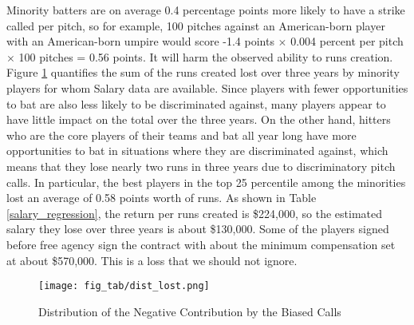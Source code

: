 \documentclass[dvipdfmx, 12pt]{jsarticle}
\begin{document}
\begin{table}[ht]
  \centering
  \caption{Runs Expectancy by 24 States}
  \label{re24}
\end{table}

Minority batters are on average 0.4 percentage points more likely to have a strike called per pitch, so for example, 100 pitches against an American-born player with an American-born umpire would score -1.4 points $\times$ 0.004 percent per pitch $\times$ 100 pitches = 0.56 points. It will harm the observed ability to runs creation.
Figure \ref{dist_lost} quantifies the sum of the runs created lost over three years by minority players for whom Salary data are available. Since players with fewer opportunities to bat are also less likely to be discriminated against, many players appear to have little impact on the total over the three years. On the other hand, hitters who are the core players of their teams and bat all year long have more opportunities to bat in situations where they are discriminated against, which means that they lose nearly two runs in three years due to discriminatory pitch calls. In particular, the best players in the top 25 percentile among the minorities lost an average of 0.58 points worth of runs. As shown in Table \ref{salary_regression}, the return per runs created is \$224,000, so the estimated salary they lose over three years is about \$130,000. Some of the players signed before free agency sign the contract with about the minimum compensation set at about \$570,000. This is a loss that we should not ignore.

\begin{figure}[ht]
  \centering
  \caption{Distribution of the Negative Contribution by the Biased Calls}
  \texttt{[image: fig\_tab/dist\_lost.png]}
  \label{dist_lost}
\end{figure}
\end{document}
